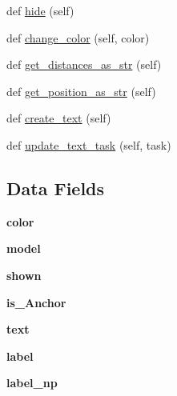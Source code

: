 \begin{DoxyCompactItemize}
\item 
def \mbox{\hyperlink{class_rendering_1_1_rendered_node_ac3c535fd36dc5473ff98017920898352}{hide}} (self)
\item 
def \mbox{\hyperlink{class_rendering_1_1_rendered_node_a882efd96cadb1e70c9583217fa8725f0}{change\+\_\+color}} (self, color)
\item 
def \mbox{\hyperlink{class_rendering_1_1_rendered_node_a6a5edcc7b40b4e6cb4057afc9e6a4025}{get\+\_\+distances\+\_\+as\+\_\+str}} (self)
\item 
def \mbox{\hyperlink{class_rendering_1_1_rendered_node_a2456c7486bc468bd6b0e9277336f6453}{get\+\_\+position\+\_\+as\+\_\+str}} (self)
\item 
def \mbox{\hyperlink{class_rendering_1_1_rendered_node_a0f92537796b85454021dd7ce8e55a3fa}{create\+\_\+text}} (self)
\item 
def \mbox{\hyperlink{class_rendering_1_1_rendered_node_a960251572481fb35d40b7f784de22232}{update\+\_\+text\+\_\+task}} (self, task)
\end{DoxyCompactItemize}
\subsection*{Data Fields}
\begin{DoxyCompactItemize}
\item 
\mbox{\label{class_rendering_1_1_rendered_node_a37dbdc30935031c05304482e1be89d8f}} 
{\bfseries color}
\item 
\mbox{\label{class_rendering_1_1_rendered_node_a508cc3106d2c29fe07dc87cbe3ea6927}} 
{\bfseries model}
\item 
\mbox{\label{class_rendering_1_1_rendered_node_ac6c1eeb684483c821de0ec90f6c47cb9}} 
{\bfseries shown}
\item 
\mbox{\label{class_rendering_1_1_rendered_node_aa5adb9f4f83816eec03ab763606632a3}} 
{\bfseries is\+\_\+\+Anchor}
\item 
\mbox{\label{class_rendering_1_1_rendered_node_af575f17e6be3f269b86b041a60560dbf}} 
{\bfseries text}
\item 
\mbox{\label{class_rendering_1_1_rendered_node_a22f45a3cb4f074e609f58ebaeef0ecf9}} 
{\bfseries label}
\item 
\mbox{\label{class_rendering_1_1_rendered_node_a9a4324383b31c43c3ba7034d0fb36997}} 
{\bfseries label\+\_\+np}
\end{DoxyCompactItemize}


